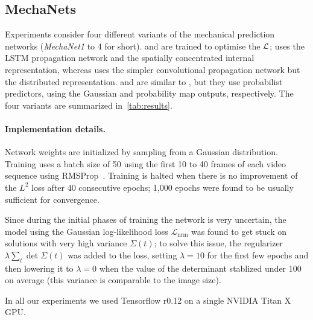 \subsection{MechaNets}\label{sec:implem}






Experiments consider four different variants of the mechanical prediction networks (\emph{MechaNet1} to 4 for short). \NetOne and \NetTwo are trained to optimise the $\mathcal{L}$; \NetOne uses the LSTM propagation network and the spatially concentrated internal representation, whereas \NetTwo uses the simpler convolutional propagation network but the distributed representation. \NetThree and \NetFour are similar to \NetTwo, but they use probabilist predictors, using the Gaussian and probability map outputs, respectively. The four variants are summarized in~\cref{tab:results}.

\paragraph{Implementation details.} Network weights are initialized by sampling from a Gaussian distribution. Training uses a batch size of 50 using the first 10 to 40 frames of each video sequence using RMSProp~\cite{Tieleman2012}. Training is halted when there is no improvement of the $L^2$ loss after 40 consecutive epochs; 1,000 epochs were found to be usually sufficient for convergence. 

Since during the initial phases of training the network is very uncertain, the model using the Gaussian log-likelihood loss $\mathcal{L}_\text{nrm}$ was found to get stuck on solutions with very high variance $\Sigma(t)$; to solve this issue, the regularizer $\lambda \sum_t \det \Sigma(t)$ was added to the loss, setting $\lambda=10$ for the first few epochs and then lowering it to $\lambda = 0$ when the value of the determinant stablized under 100 on average (this variance is comparable to the image size).

In all our experiments we used Tensorflow \cite{tensorflow2015-whitepaper} r0.12 on a single NVIDIA Titan X GPU. 